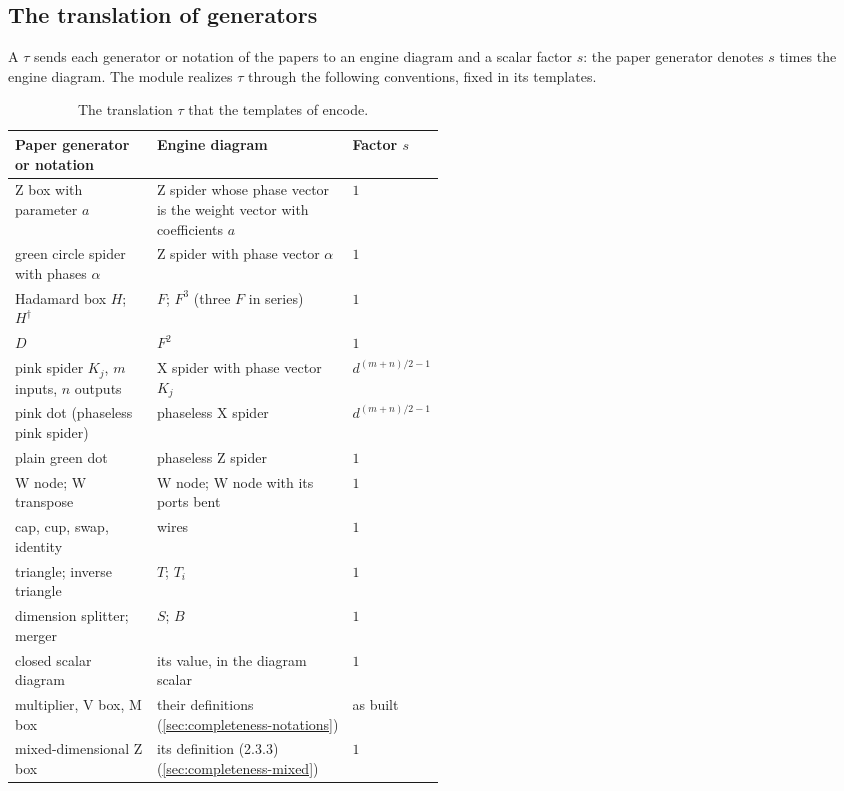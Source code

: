 \subsection{The translation of generators}\label{sec:completeness-translation}

A  $\tau$ sends each generator or notation of the papers to an engine diagram
and a scalar factor $s$: the paper generator denotes $s$ times the engine diagram. The module
realizes $\tau$ through the following conventions, fixed in its templates.

\begin{table}[H]
\centering\small
\begin{tabularx}{\linewidth}{@{}>{\raggedright\arraybackslash}p{0.33\linewidth}>{\raggedright\arraybackslash}X>{\raggedright\arraybackslash}p{0.17\linewidth}@{}}
\toprule
Paper generator or notation & Engine diagram & Factor $s$ \\
\midrule
Z box with parameter $a$ & Z spider whose phase vector is the weight vector with coefficients $a$ & $1$ \\
green circle spider with phases $\alpha$ & Z spider with phase vector $\alpha$ & $1$ \\
Hadamard box $H$; $H^\dagger$ & $F$; $F^3$ (three $F$ in series) & $1$ \\
$D$ & $F^2$ & $1$ \\
pink spider $K_j$, $m$ inputs, $n$ outputs & X spider with phase vector $K_j$ & $d^{(m+n)/2-1}$ \\
pink dot (phaseless pink spider) & phaseless X spider & $d^{(m+n)/2-1}$ \\
plain green dot & phaseless Z spider & $1$ \\
W node; W transpose & W node; W node with its ports bent & $1$ \\
cap, cup, swap, identity & wires & $1$ \\
triangle; inverse triangle & $T$; $T_i$ & $1$ \\
dimension splitter; merger & $S$; $B$ & $1$ \\
closed scalar diagram & its value, in the diagram scalar & $1$ \\
multiplier, V box, M box & their definitions (\cref{sec:completeness-notations}) & as built \\
mixed-dimensional Z box & its definition (2.3.3) (\cref{sec:completeness-mixed}) & $1$ \\
\bottomrule
\end{tabularx}
\caption{The translation $\tau$ that the templates of  encode.}
\label{tab:completeness-translation}
\end{table}

